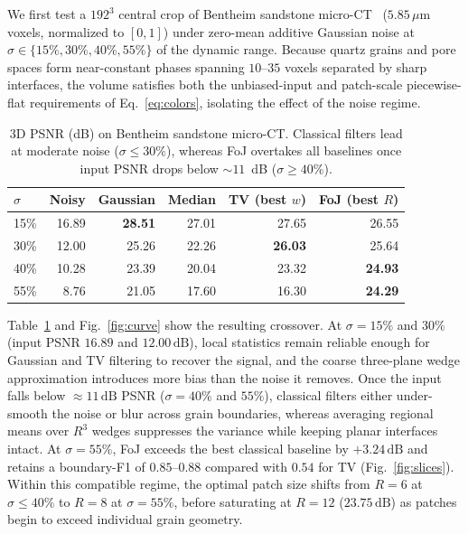 \documentclass[11pt]{article}
\newcommand{\dB}{\,\mathrm{dB}}
\begin{document}
We first test a $192^3$ central crop of Bentheim sandstone
micro-CT~\cite{bentheim2015zenodo} ($5.85\,\mu\mathrm{m}$ voxels,
normalized to $[0,1]$) under zero-mean additive Gaussian noise at
$\sigma\in\{15\%,30\%,40\%,55\%\}$ of the dynamic range. Because quartz
grains and pore spaces form near-constant phases spanning $10$--$35$
voxels separated by sharp interfaces, the volume satisfies both the
unbiased-input and patch-scale piecewise-flat requirements of Eq.~\eqref{eq:colors},
isolating the effect of the noise regime.

\begin{table}[H]
\centering\small
\begin{tabular}{lrrrrr}
\toprule
$\sigma$ & Noisy & Gaussian & Median & TV (best $w$) & FoJ (best $R$)\\
\midrule
15\% & 16.89 & \textbf{28.51} & 27.01 & 27.65 & 26.55\\
30\% & 12.00 & 25.26 & 22.26 & \textbf{26.03} & 25.64\\
40\% & 10.28 & 23.39 & 20.04 & 23.32 & \textbf{24.93}\\
55\% & \phantom{0}8.76 & 21.05 & 17.60 & 16.30 & \textbf{24.29}\\
\bottomrule
\end{tabular}
\caption{3D PSNR (dB) on Bentheim sandstone micro-CT. Classical filters
lead at moderate noise ($\sigma\le30\%$), whereas FoJ overtakes all
baselines once input PSNR drops below ${\sim}11$~dB ($\sigma\ge40\%$).}
\label{tab:bentheim}
\end{table}

Table~\ref{tab:bentheim} and Fig.~\ref{fig:curve} show the resulting
crossover. At $\sigma{=}15\%$ and $30\%$ (input PSNR $16.89$ and
$12.00\dB$), local statistics remain reliable enough for Gaussian and TV
filtering to recover the signal, and the coarse three-plane wedge
approximation introduces more bias than the noise it removes. Once the
input falls below ${\approx}11\dB$ PSNR ($\sigma{=}40\%$ and $55\%$),
classical filters either under-smooth the noise or blur across grain
boundaries, whereas averaging regional means over $R^3$ wedges
suppresses the variance while keeping planar interfaces intact. At
$\sigma{=}55\%$, FoJ exceeds the best classical baseline by $+3.24\dB$
and retains a boundary-F1 of $0.85$--$0.88$ compared with $0.54$ for TV
(Fig.~\ref{fig:slices}). Within this compatible regime, the optimal
patch size shifts from $R{=}6$ at $\sigma\le40\%$ to $R{=}8$ at
$\sigma{=}55\%$, before saturating at $R{=}12$ ($23.75\dB$) as patches
begin to exceed individual grain geometry.
\end{document}
